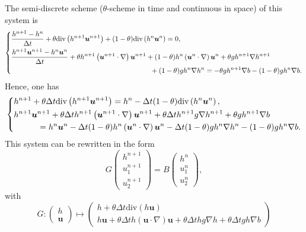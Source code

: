 \documentclass[a4paper, 11pt]{report}
\begin{document}
The semi-discrete scheme ($\theta$-scheme in time and continuous in space) of this system is
\begin{equation*}
\left\{\begin{split}
&\frac{h^{n+1}-h^n}{\Delta t}+\theta\text{div}\left(h^{n+1}\boldsymbol{u}^{n+1}\right)+(1-\theta)\text{div}\left(h^{n}\boldsymbol{u}^{n}\right)=0,\\
&\frac{h^{n+1}\boldsymbol{u}^{n+1}-h^n\boldsymbol{u}^{n}}{\Delta t}+\theta h^{n+1}\left(\boldsymbol{u}^{n+1}\cdot \nabla\right)\boldsymbol{u}^{n+1}+(1-\theta) h^{n}\left(\boldsymbol{u}^{n}\cdot \nabla\right)\boldsymbol{u}^{n}+\theta gh^{n+1}\nabla h^{n+1}\\
&\hspace*{7cm}+(1-\theta)gh^n\nabla h^n=-\theta gh^{n+1}\nabla b-(1-\theta) gh^{n}\nabla b.
\end{split}\right.
\end{equation*}
Hence, one has
\begin{equation*}
\left\{
\begin{split}
&h^{n+1}+\theta\Delta t\text{div}\left(h^{n+1}\boldsymbol{u}^{n+1}\right)=h^n-\Delta t(1-\theta)\text{div}\left(h^n\boldsymbol{u}^n\right),\\
&h^{n+1}\boldsymbol{u}^{n+1}+\theta\Delta th^{n+1}\left(\boldsymbol{u}^{n+1}\cdot\nabla\right)\boldsymbol{u}^{n+1}+\theta\Delta th^{n+1}g\nabla h^{n+1}+\theta gh^{n+1}\nabla b\\
&\hspace*{1cm}=h^n\boldsymbol{u}^n-\Delta t(1-\theta)h^n\left(\boldsymbol{u}^n\cdot \nabla\right)\boldsymbol{u}^n-\Delta t(1-\theta)gh^n\nabla h^n-(1-\theta) gh^n \nabla b.
\end{split}
\right.
\end{equation*}
This system can be rewritten in the form
\begin{equation*}
G\begin{pmatrix}h^{n+1}\\u_1^{n+1}\\u_2^{n+1}\end{pmatrix}=B\begin{pmatrix}h^n\\u_1^n\\u_2^n\end{pmatrix},
\end{equation*}
with 
\begin{equation*}
G:\begin{pmatrix}h\\\boldsymbol{u}\end{pmatrix}\mapsto\begin{pmatrix}h+\theta\Delta t\text{div}\left(h\boldsymbol{u}\right)\\
h\boldsymbol{u}+\theta\Delta t h\left(\boldsymbol{u}\cdot \nabla\right)\boldsymbol{u}+\theta \Delta thg\nabla h+\theta\Delta t gh\nabla b
\end{pmatrix}
\end{equation*}
\end{document}
